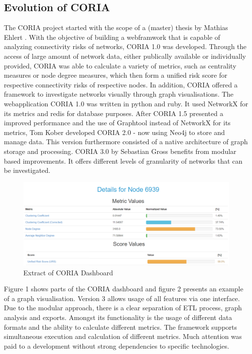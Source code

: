\documentclass[conference, 11pt]{IEEEtran}
\begin{document}
\subsection{Evolution of CORIA}
The CORIA project started with the scope of a (master) thesis by Mathias Ehlert \cite{Ehlert}. With the objective of building a webframwork that is capable of analyzing connectivity risks of networks, CORIA 1.0 was developed. Through the access of large amount of network data, either publically available or individually provided, CORIA was able to calculate a variety of metrics, such as  
centrality measures or node degree measures, which then form a unified risk score for respective connectivity risks of respective nodes. In addition, CORIA offered a framework to investigate networks visually through graph visualisations. 
 The webapplication CORIA 1.0 was written in python and ruby. It used NetworkX for its metrics and redis for database purposes. After CORIA 1.5 presented a improved performance and the use of Graphtool instead of NetworkX for its metrics, Tom Kober developed CORIA 2.0 - now using Neo4j to store and manage data\cite{Coria1.5}. This version furthermore consisted of a native architecture of graph storage and processing\cite{Coria2}. CORIA 3.0 by Sebastian Gross benefits from modular based improvements. It offers different levels of granularity of networks that can be investigated.

 \begin{figure}[htbp]
\centerline{\includegraphics[scale=0.4]{Graphics/CORIAExtract.PNG}}
\caption{Extract of CORIA Dashboard}
\label{fig}
\end{figure}

 Figure 1 shows parts of the CORIA dashboard and figure 2 presents an example of a graph visualisation. Version 3 allows usage of all features via one interface. Due to the modular approach, there is a clear separation of ETL process, graph analysis and exports. Amongst its functionality is the usage of different data formats and the ability to calculate different metrics. The framework supports simultaneous execution and calculation of different metrics. Much attention was paid to a development without strong dependencies to specific technologies\cite{Coria3}.
   
\end{document}
